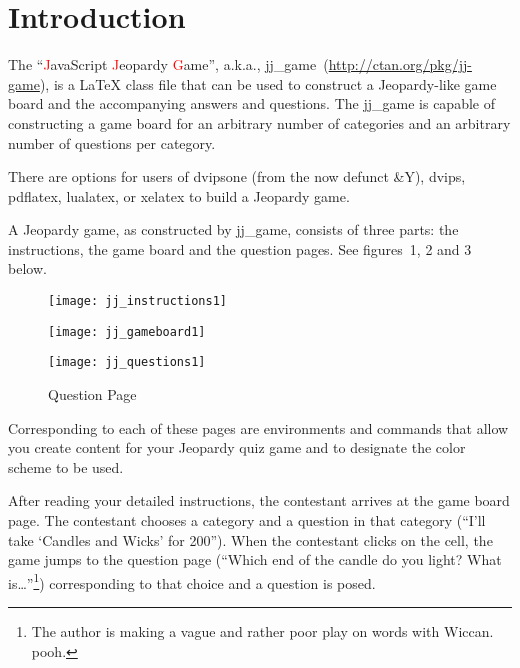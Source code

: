 \documentclass{article}
\def\jj{\textsf{jj\_game}}
\begin{document}
\maketitle

\tableofcontents
{}

\section{Introduction}

The ``\textcolor{red}JavaScript \textcolor{red}Jeopardy
\textcolor{red}Game'', a.k.a., \jj\ (\url{http://ctan.org/pkg/jj-game}), is a \LaTeX{} class file that
can be used to construct a Jeopardy-like game board and the
accompanying answers and questions.  The \jj{} is capable of
constructing a game board for an arbitrary number of categories and
an arbitrary number of questions per category.

There are options for users of \textsf{dvipsone} (from the now defunct \Y&Y),
\textsf{dvips}, \textsf{pdflatex}, \textsf{lualatex}, or \textsf{xelatex} to build a Jeopardy game.

A Jeopardy game, as constructed by {\jj}, consists of three parts: the instructions,
the game board and the question pages. See figures~1, 2 and 3 below.

\begin{figure}[ht]
\centering
\hskip-62.5pt
\begin{minipage}{\linewidth+62.5pt}
\parbox{.3\linewidth}{\texttt{[image: jj\_instructions1]}
\caption{Instructions Page}\label{fig:instrPage}}\hfill
\parbox{.3\linewidth}{\texttt{[image: jj\_gameboard1]}
\caption{Game Board Page}\label{fig:gameboard}}\hfill
\parbox{.3\linewidth}{\texttt{[image: jj\_questions1]}
\caption{Question Page}\label{fig:questions}}
\end{minipage}
\end{figure}

Corresponding to each of these pages are environments and commands
that allow you create content for your Jeopardy quiz game and to designate the
color scheme to be used.

After reading your detailed instructions, the contestant arrives at
the game board page. The contestant chooses a category and a
question in that category (``I'll take `Candles and Wicks' for
200''). When the contestant clicks on the cell, the game jumps to
the question page (``Which end of the candle do you light? What
is\dots''\footnote{The author is making a vague and rather poor play
on words with Wiccan. pooh.}) corresponding to that choice and a
question is posed.
\end{document}
